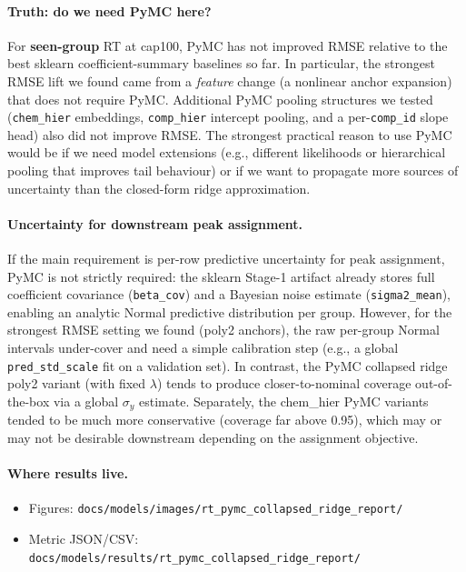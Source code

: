 \documentclass[11pt]{article}
\begin{document}
\paragraph{Truth: do we need PyMC here?}
For \textbf{seen-group} RT at cap100, PyMC has not improved RMSE relative to the best sklearn coefficient-summary baselines so far.
In particular, the strongest RMSE lift we found came from a \emph{feature} change (a nonlinear anchor expansion) that does not require
PyMC. Additional PyMC pooling structures we tested (\texttt{chem\_hier} embeddings, \texttt{comp\_hier} intercept pooling, and a
per-\texttt{comp\_id} slope head) also did not improve RMSE.
The strongest practical reason to use PyMC would be if we need model extensions (e.g., different likelihoods or hierarchical pooling that
improves tail behaviour) or if we want to propagate more sources of uncertainty than the closed-form ridge approximation.

\paragraph{Uncertainty for downstream peak assignment.}
If the main requirement is per-row predictive uncertainty for peak assignment, PyMC is not strictly required: the sklearn Stage-1 artifact
already stores full coefficient covariance (\texttt{beta\_cov}) and a Bayesian noise estimate (\texttt{sigma2\_mean}), enabling an analytic
Normal predictive distribution per group. However, for the strongest RMSE setting we found (poly2 anchors), the raw per-group Normal
intervals under-cover and need a simple calibration step (e.g., a global \texttt{pred\_std\_scale} fit on a validation set).
In contrast, the PyMC collapsed ridge poly2 variant (with fixed $\lambda$) tends to produce closer-to-nominal coverage out-of-the-box via
a global $\sigma_y$ estimate. Separately, the chem\_hier PyMC variants tended to be much more conservative (coverage far above 0.95),
which may or may not be desirable downstream depending on the assignment objective.

\paragraph{Where results live.}
\begin{itemize}
  \item Figures: \texttt{docs/models/images/rt\_pymc\_collapsed\_ridge\_report/}
  \item Metric JSON/CSV: \texttt{docs/models/results/rt\_pymc\_collapsed\_ridge\_report/}
\end{itemize}
\end{document}
